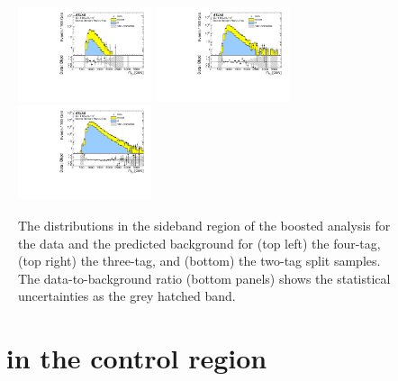 \begin{figure}[htbp!]
\begin{center}
 \includegraphics[width=0.35\textwidth,angle=-90]{figures/boosted/Paperplot/Moriond_bkg_9_FourTag_Sideband_mHH_l_1.pdf}
 \includegraphics[width=0.35\textwidth,angle=-90]{figures/boosted/Paperplot/Moriond_bkg_9_ThreeTag_Sideband_mHH_l_1.pdf}\\
 \includegraphics[width=0.35\textwidth,angle=-90]{figures/boosted/Paperplot/Moriond_bkg_9_TwoTag_split_Sideband_mHH_l_1.pdf}\\
\caption{The \mtwoJ distributions in the sideband region of the boosted analysis for the data and the predicted background for (top left) the four-tag, (top right) the three-tag, and (bottom) the two-tag split samples. The data-to-background ratio (bottom panels) shows the statistical uncertainties as the grey hatched band.}
\label{fig:boosted-sb-mjj}
\end{center}
\end{figure}

\clearpage
\section{\mtwoJ~ in the control region}
\label{sec:boosted-cr}

